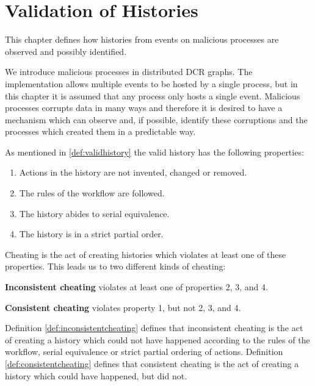 \chapter{Validation of Histories}\label{chap:validation}
	This chapter defines how histories from events on malicious processes are observed and possibly identified.
	
	\newpar We introduce malicious processes in distributed DCR graphs. The implementation allows multiple events to be hosted by a single process, but in this chapter it is assumed that any process only hosts a single event. Malicious processes corrupts data in many ways and therefore it is desired to have a mechanism which can observe and, if possible, identify these corruptions and the processes which created them in a predictable way. 
    
    \newpar As mentioned in \autoref{def:validhistory} the valid history has the following properties:
    
    \begin{enumerate}
    	\item Actions in the history are not invented, changed or removed.
    	\item The rules of the workflow are followed.
    	\item The history abides to serial equivalence.
    	\item The history is in a strict partial order.
    \end{enumerate}
	
	\noindent Cheating is the act of creating histories which violates at least one of these properties. This leads us to two different kinds of cheating:
	
	\begin{definition}
		\textbf{Inconsistent cheating} violates at least one of properties 2, 3, and 4.
		\label{def:inconsistentcheating}
	\end{definition}
	
	\begin{definition}
		\textbf{Consistent cheating} violates property 1, but not 2, 3, and 4.
		\label{def:consistentcheating}
	\end{definition}
	
	\noindent Definition \ref{def:inconsistentcheating} defines that inconsistent cheating is the act of creating a history which could not have happened according to the rules of the workflow, serial equivalence or strict partial ordering of actions. Definition \ref{def:consistentcheating} defines that consistent cheating is the act of creating a history which could have happened, but did not.
	

